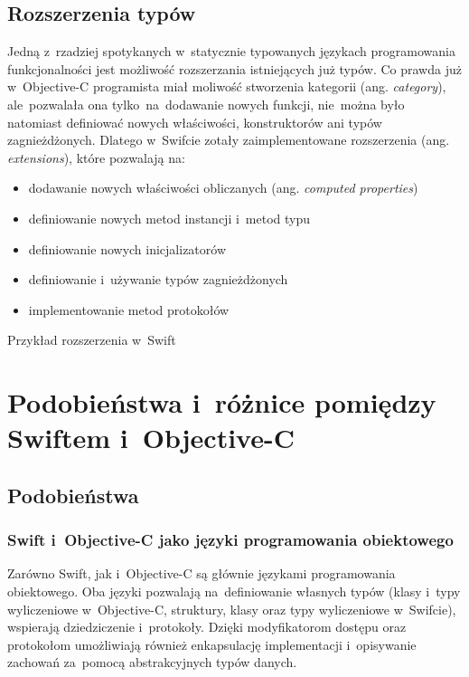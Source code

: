 \documentclass[mgr, shortabstract]{iithesis}
\newcommand{\ang}[1]{ang. \textit{#1}}
\newcommand{\swiftlisting}[2]{
    \swiftcode{src/#1.swift}
    \begin{listing}[ht]
      \caption{#2}
      \label{l:#1}
    \end{listing}
}
\begin{document}
\section{Rozszerzenia typów}
\label{s:rozszerzenia_typow}

Jedną z~rzadziej spotykanych w~statycznie typowanych językach programowania funkcjonalności jest możliwość rozszerzania istniejących już typów. Co prawda już w~Objective-C programista miał moliwość stworzenia kategorii (\ang{category}), ale~pozwalała ona tylko~na~dodawanie nowych funkcji, nie~można było natomiast definiować nowych właściwości, konstruktorów ani typów zagnieżdżonych. Dlatego w~Swifcie zotały zaimplementowane rozszerzenia (\ang{extensions}), które pozwalają na:

\begin{itemize}
    \item dodawanie nowych właściwości obliczanych (\ang{computed properties})
    \item definiowanie nowych metod instancji i~metod typu
    \item definiowanie nowych inicjalizatorów
    \item definiowanie i~używanie typów zagnieżdżonych
    \item implementowanie metod protokołów
\end{itemize}

\swiftlisting{2_extension}{Przykład rozszerzenia w~Swift}

\chapter{Podobieństwa i~różnice pomiędzy Swiftem i~Objective-C}
\label{ch:swift-objc}

\section{Podobieństwa}

\subsection{Swift i~Objective-C jako języki programowania obiektowego}

Zarówno Swift, jak i~Objective-C są głównie językami programowania  obiektowego. Oba języki pozwalają na~definiowanie własnych typów (klasy i~typy wyliczeniowe w~Objective-C, struktury, klasy oraz typy wyliczeniowe w~Swifcie), wspierają dziedziczenie i~protokoły. Dzięki modyfikatorom dostępu oraz protokołom umożliwiają również enkapsulację implementacji i~opisywanie zachowań za~pomocą abstrakcyjnych typów danych.
\end{document}
